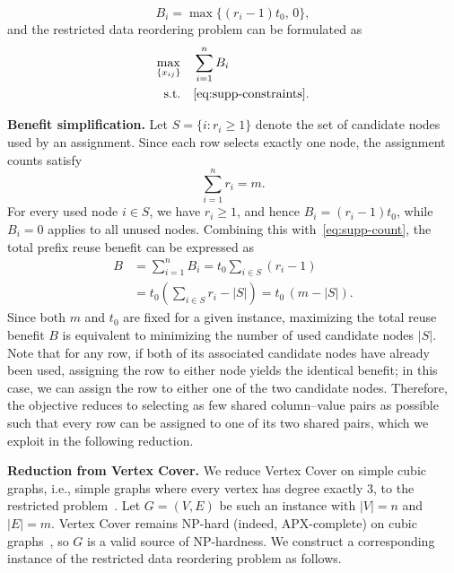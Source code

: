 \begin{equation}
B_i=\max\{(r_i-1)t_0,\,0\},
\end{equation}
and the restricted data reordering problem can be formulated as
\begin{equation}
\begin{aligned}
\max_{\{x_{ij}\}}\quad & \sum_{i=1}^{n}B_i\\
\mathrm{s.t.}\quad & \eqref{eq:supp-constraints}.
\end{aligned}
\label{eq:supp-restricted}
\end{equation}

\textbf{Benefit simplification.} Let $S=\{i:r_i\geq1\}$ denote the set of candidate nodes used by an assignment. Since each row selects exactly one node, the assignment counts satisfy
\begin{equation}
\sum_{i=1}^{n}r_i=m.
\label{eq:supp-count}
\end{equation}
For every used node $i\in S$, we have $r_i\geq1$, and hence $B_i=(r_i-1)t_0$, while $B_i=0$ applies to all unused nodes. Combining this with~\eqref{eq:supp-count}, the total prefix reuse benefit can be expressed as
\begin{equation}
\begin{aligned}
B &=\sum_{i=1}^{n}B_i
   =t_0\sum_{i\in S}(r_i-1)\\
  &=t_0\left(\sum_{i\in S}r_i-|S|\right)
   =t_0\,(m-|S|).
\end{aligned}
\label{eq:supp-benefit}
\end{equation}
Since both $m$ and $t_0$ are fixed for a given instance, maximizing the total reuse benefit $B$ is equivalent to minimizing the number of used candidate nodes $|S|$. Note that for any row, if both of its associated candidate nodes have already been used, assigning the row to either node yields the identical benefit; in this case, we can assign the row to either one of the two candidate nodes. Therefore, the objective reduces to selecting as few shared column--value pairs as possible such that every row can be assigned to one of its two shared pairs, which we exploit in the following reduction.

\textbf{Reduction from Vertex Cover.}
We reduce Vertex Cover on simple cubic graphs, i.e., simple graphs where every vertex has degree exactly $3$, to the restricted problem~\cite{AlimontiKann2000}. Let $G = (V, E)$ be such an
instance with $|V| = n$ and $|E| = m$. 
Vertex Cover remains NP-hard (indeed, APX-complete) on cubic graphs~\cite{AlimontiKann2000}, so $G$ is a valid source of NP-hardness.
We construct a
corresponding instance of the restricted data reordering problem as follows.

